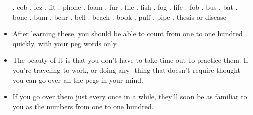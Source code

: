 \begin{itemize}
                . cob
                . fez
                . fit
                . phone
                . foam
                . fur
                . file
                . fish
                . fog
                . fife
                . fob
                . bus
                . bat
                . bone
                . bum
                . bear
                . bell
                . beach
                . book
                . puff
                . pipe
                . thesis or disease
            \item After learning these, you should be able to count from
            one to one hundred quickly, with your peg words only.
            \item The beauty of it is that you don't have to take time out
            to practice them. If you're traveling to work, or doing any-
            thing that doesn't require thought—you can go over all the
            pegs in your mind.
            \item If you go over them just every once in
            a while, they'll soon be as familiar to you as the numbers
            from one to one hundred.

        \end{itemize}

